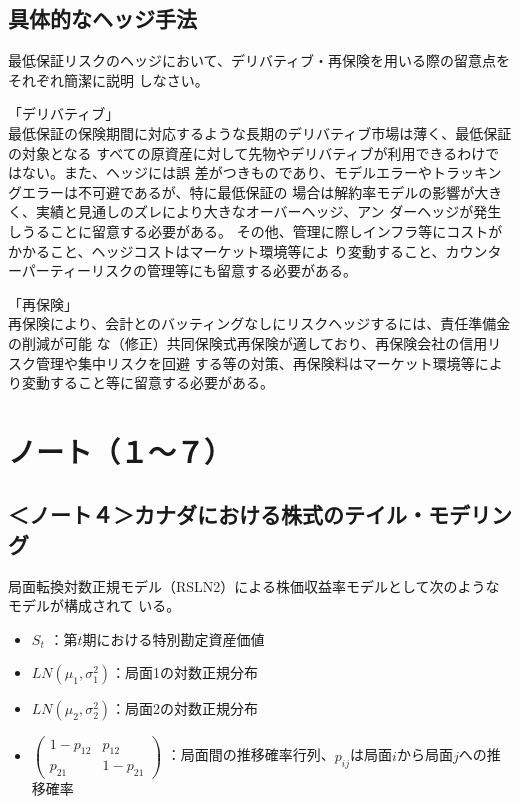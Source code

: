 \documentclass[report,gutter=10mm,fore-edge=10mm,uplatex,dvipdfmx]{jlreq}
\begin{document}
\subsection{具体的なヘッジ手法}
最低保証リスクのヘッジにおいて、デリバティブ・再保険を用いる際の留意点をそれぞれ簡潔に説明
しなさい。
\answer{}

「デリバティブ」\\
最低保証の保険期間に対応するような長期のデリバティブ市場は薄く、最低保証の対象となる
すべての原資産に対して先物やデリバティブが利用できるわけではない。また、ヘッジには誤
差がつきものであり、モデルエラーやトラッキングエラーは不可避であるが、特に最低保証の
場合は解約率モデルの影響が大きく、実績と見通しのズレにより大きなオーバーヘッジ、アン
ダーヘッジが発生しうることに留意する必要がある。
その他、管理に際しインフラ等にコストがかかること、ヘッジコストはマーケット環境等によ
り変動すること、カウンターパーティーリスクの管理等にも留意する必要がある。

「再保険」\\
再保険により、会計とのバッティングなしにリスクヘッジするには、責任準備金の削減が可能
な（修正）共同保険式再保険が適しており、再保険会社の信用リスク管理や集中リスクを回避
する等の対策、再保険料はマーケット環境等により変動すること等に留意する必要がある。

\section{ノート（１～７）}
\subsection{＜ノート４＞カナダにおける株式のテイル・モデリング}

局面転換対数正規モデル（RSLN2）による株価収益率モデルとして次のようなモデルが構成されて
いる。
\begin{itemize}
\item $S_t$ ：第$t$期における特別勘定資産価値
\item $LN(\mu_1,\sigma^2_1)$：局面1の対数正規分布
\item $LN(\mu_2,\sigma^2_2)$：局面2の対数正規分布
\item $\begin{pmatrix}
 1 - p_{12} & p_{12} \\
 p_{21} & 1 - p_{21}
 \end{pmatrix}$ ：局面間の推移確率行列、$p_{ij}$は局面$i$から局面$j$への推移確率
\end{itemize}
\end{document}
